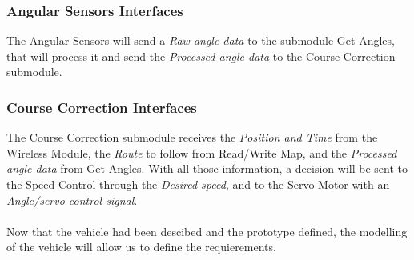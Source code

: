 \subsubsection{Angular Sensors Interfaces}
The Angular Sensors will send a \textit{Raw angle data} to the submodule  Get Angles, that will process it and send the \textit{Processed angle data} to the Course Correction submodule.

\subsubsection{Course Correction Interfaces}
The Course Correction submodule receives the \textit{Position and Time} from the Wireless Module, the \textit{Route} to follow from Read/Write Map, and the \textit{Processed angle data} from Get Angles. With all those information, a decision will be sent to the Speed Control through the \textit{Desired speed}, and to the Servo Motor with an \textit{Angle/servo control signal}.\\\\


Now that the vehicle had been descibed and the prototype defined, the modelling of the vehicle will allow us to define the requierements.


